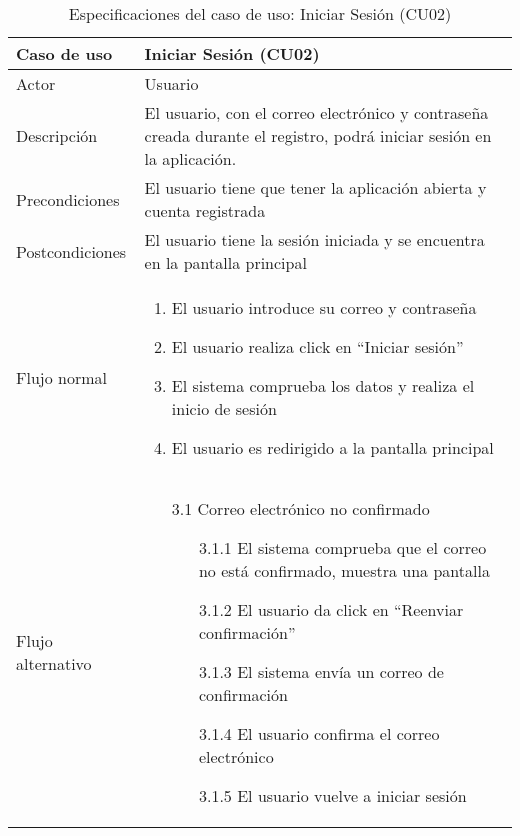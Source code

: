 \begin{table}[h]
    \centering
    \begin{tabular}{|m{3cm}|m{11cm}|}
        \hline
        \rowcolor{blue!20} Caso de uso & Iniciar Sesión (CU02) \\
        \hline
        Actor & Usuario \\
        \hline
        \rowcolor{blue!20} Descripción & El usuario, con el correo electrónico y contraseña creada durante el registro, podrá iniciar sesión en la aplicación. \\
        \hline
        Precondiciones & El usuario tiene que tener la aplicación abierta y cuenta registrada \\
        \hline
        \rowcolor{blue!20} Postcondiciones & El usuario tiene la sesión iniciada y se encuentra en la pantalla principal \\
        \hline
        Flujo normal & 
            \begin{enumerate}[noitemsep]
            \item El usuario introduce su correo y contraseña
            \item El usuario realiza click en \enquote{Iniciar sesión}
            \item El sistema comprueba los datos y realiza el inicio de sesión
            \item El usuario es redirigido a la pantalla principal
            \end{enumerate}
         \\
        \hline
        Flujo alternativo & 
        \begin{enumerate}[noitemsep]
            \item[3.1] Correo electrónico no confirmado
            \begin{enumerate}[noitemsep]
                \item[3.1.1] El sistema comprueba que el correo no está confirmado, muestra una pantalla
                \item[3.1.2] El usuario da click en \enquote{Reenviar confirmación}
                \item[3.1.3] El sistema envía un correo de confirmación
                \item[3.1.4] El usuario confirma el correo electrónico
                \item[3.1.5] El usuario vuelve a iniciar sesión 
            \end{enumerate}
        \end{enumerate} \\
        \hline
    \end{tabular}
    \caption{Especificaciones del caso de uso: Iniciar Sesión (CU02)}
\end{table}

